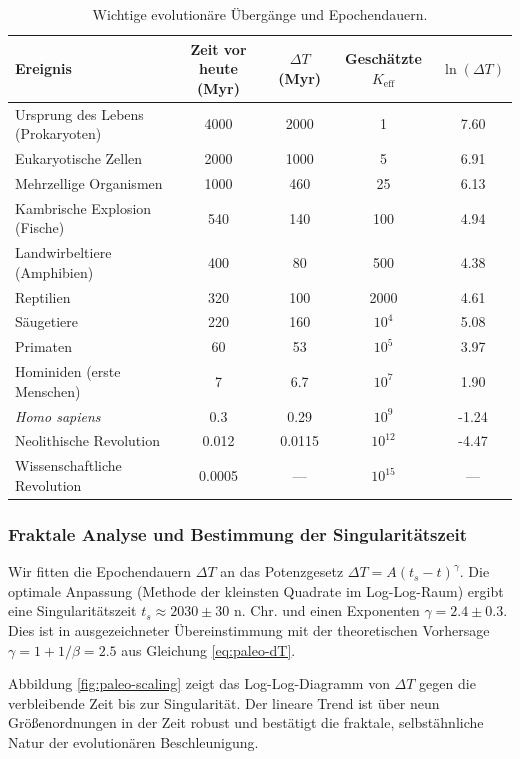 \documentclass[12pt,a4paper]{article}
\theoremstyle{remark}
\begin{document}
	\begin{table}[htbp]
		\centering
		\caption{Wichtige evolutionäre Übergänge und Epochendauern.}
		\label{tab:evolutionary-epochs}
		\footnotesize \begin{tabular}{l c c c c}
			\toprule
			\textbf{Ereignis} & \textbf{Zeit vor heute (Myr)} & $\Delta T$ (Myr) & Geschätzte $K_{\mathrm{eff}}$ & $\ln(\Delta T)$ \\
			\midrule
			Ursprung des Lebens (Prokaryoten) & 4000 & 2000 & 1 & 7.60 \\
			Eukaryotische Zellen & 2000 & 1000 & 5 & 6.91 \\
			Mehrzellige Organismen & 1000 & 460 & 25 & 6.13 \\
			Kambrische Explosion (Fische) & 540 & 140 & 100 & 4.94 \\
			Landwirbeltiere (Amphibien) & 400 & 80 & 500 & 4.38 \\
			Reptilien & 320 & 100 & 2000 & 4.61 \\
			Säugetiere & 220 & 160 & \(10^4\) & 5.08 \\
			Primaten & 60 & 53 & \(10^5\) & 3.97 \\
			Hominiden (erste Menschen) & 7 & 6.7 & \(10^7\) & 1.90 \\
			\emph{Homo sapiens} & 0.3 & 0.29 & \(10^9\) & -1.24 \\
			Neolithische Revolution & 0.012 & 0.0115 & \(10^{12}\) & -4.47 \\
			Wissenschaftliche Revolution & 0.0005 & --- & \(10^{15}\) & --- \\
			\bottomrule
		\end{tabular}
	\end{table}
	
	\subsubsection{Fraktale Analyse und Bestimmung der Singularitätszeit}
	
	Wir fitten die Epochendauern $\Delta T$ an das Potenzgesetz $\Delta T = A (t_s - t)^{\gamma}$. Die optimale Anpassung (Methode der kleinsten Quadrate im Log-Log-Raum) ergibt eine Singularitätszeit $t_s \approx 2030 \pm 30$ n. Chr. und einen Exponenten $\gamma = 2.4 \pm 0.3$. Dies ist in ausgezeichneter Übereinstimmung mit der theoretischen Vorhersage $\gamma = 1 + 1/\beta = 2.5$ aus Gleichung \eqref{eq:paleo-dT}.
	
	Abbildung \ref{fig:paleo-scaling} zeigt das Log-Log-Diagramm von $\Delta T$ gegen die verbleibende Zeit bis zur Singularität. Der lineare Trend ist über neun Größenordnungen in der Zeit robust und bestätigt die fraktale, selbstähnliche Natur der evolutionären Beschleunigung.
	
\end{document}
